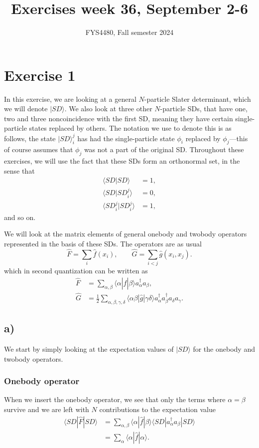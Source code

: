 \documentclass[a4paper, 11pt, notitlepage, english]{article}
\title{Exercises week 36, September 2-6}
\author{FYS4480, Fall semester 2024}
\newcommand{\ket}[1]{|#1 \rangle}
\newcommand{\braket}[2]{\langle #1 | #2 \rangle}
\newcommand{\op}[1]{\hat{#1}}
\newcommand{\braopket}[3]{\langle #1 | {#2} | #3 \rangle}
\begin{document}
\maketitle

\section*{Exercise 1}
In this exercise, we are looking at a general $N$-particle Slater determinant, which we will denote $\ket{SD}$. We also look at three other $N$-particle SDs, that have one, two and three non\-coincidence with the first SD, meaning they have certain single-particle states replaced by others. The notation we use to denote this is as follows, the state $\ket{SD}_i^j$ has had the single-particle state $\phi_i$ replaced by $\phi_j$---this of course assumes that $\phi_j$ was not a part of the original SD. Throughout these exercises, we will use the fact that these SDs form an orthonormal set, in the sense that
\begin{align*}
\braket{SD}{SD} &= 1, \\
\braket{SD}{SD_i^j} &= 0, \\
\braket{SD_i^j}{SD_i^j} &= 1,
\end{align*}
and so on.

We will look at the matrix elements of general onebody and twobody operators represented in the basis of these SDs. The operators are as usual
$$\op{F} = \sum_i \op{f}(x_i), \qquad \op{G}=\sum_{i<j}\op{g}(x_i,x_j).$$
which in second quantization can be written as
\begin{align*}
\op{F} &= \sum_{\alpha, \beta} \braopket{\alpha}{\op{f}}{\beta}a_\alpha^\dag a_\beta, \\
\op{G} &= \frac{1}{2}\sum_{\alpha, \beta, \gamma, \delta} \braopket{\alpha\beta}{\op{g}}{\gamma\delta}a_\alpha^\dag a_\beta^\dag a_\delta a_\gamma.
\end{align*}

\clearpage

\subsection*{a)}
We start by simply looking at the expectation values of $\ket{SD}$ for the onebody and twobody operators.

\subsubsection*{Onebody operator}
When we insert the onebody operator, we see that only the terms where $\alpha=\beta$ survive and we are left with $N$ contributions to the expectation value
\begin{align*}
\braopket{SD}{\op{F}}{SD} 
&= \sum_{\alpha, \beta} \braopket{\alpha}{\op{f}}{\beta}\braopket{SD}{a_\alpha^\dag a_\beta}{SD} \\&= \sum_\alpha \braopket{\alpha}{\op{f}}{\alpha}.		
\end{align*}
\end{document}
